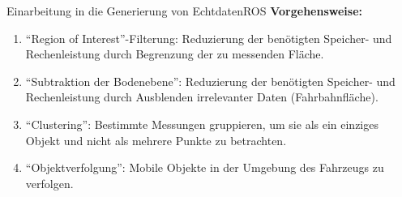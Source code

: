 \documentclass[169, handout	]{THIbeamer} %
\begin{document}
\begin{frame}{Einarbeitung in die Generierung von Echtdaten}{ROS}
	\textbf{Vorgehensweise:} 
	\begin{enumerate}
		\item \enquote{Region of Interest}-Filterung: Reduzierung der benötigten Speicher- und Rechenleistung durch Begrenzung der zu messenden Fläche.
		\item \enquote{Subtraktion der Bodenebene}: Reduzierung der benötigten Speicher- und Rechenleistung durch Ausblenden irrelevanter Daten (Fahrbahnfläche).
		\item \enquote{Clustering}: Bestimmte Messungen gruppieren, um sie als ein einziges Objekt und nicht als mehrere Punkte zu betrachten.
		\item \enquote{Objektverfolgung}: Mobile Objekte in der Umgebung des Fahrzeugs zu verfolgen. 
	\end{enumerate}
\end{frame}
\end{document}
